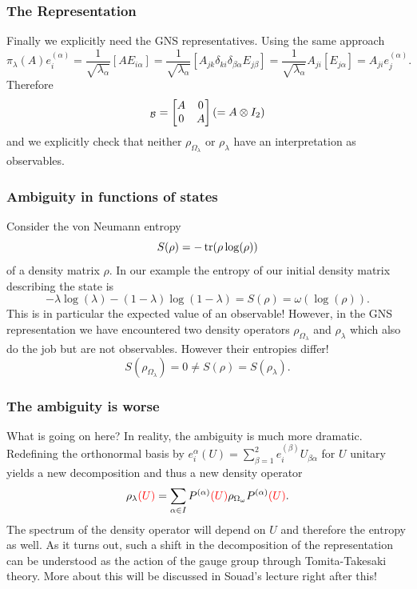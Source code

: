\documentclass{beamer}
\begin{document}
\begin{frame}
	\frametitle{The Representation}
	Finally we explicitly need the GNS representatives. Using the same approach
	\begin{equation*}
		\pi_\lambda(A)e_i^{(\alpha)}=\frac{1}{\sqrt{\lambda_\alpha}}[AE_{i\alpha}]=\frac{1}{\sqrt{\lambda_\alpha}}[A_{jk}\delta_{ki}\delta_{\beta\alpha}E_{j\beta}]=\frac{1}{\sqrt{\lambda_\alpha}}A_{ji}[E_{j\alpha}]=A_{ji}e_j^{(\alpha)}.
	\end{equation*}
	Therefore
	\begin{equation}
		[\pi_\lambda(A)]_\mathcal{B}=\mqty[A & 0\\0 &  A](=A\otimes I_2)
	\end{equation}
	and we explicitly check that neither $\rho_{\Omega_\lambda}$ or $\rho_\lambda$ have an interpretation as observables.
\end{frame}

\begin{frame}
	\frametitle{Ambiguity in functions of states}
	Consider the von Neumann entropy 
	\begin{equation}
		S(\rho)=-\tr(\rho\log(\rho))
	\end{equation}
	 of a density matrix $\rho$. In our example the entropy of our initial density matrix describing the state is 
	 \begin{equation}
	 	-\lambda\log(\lambda)-(1-\lambda)\log(1-\lambda)=S(\rho)=\omega(\log(\rho)).
	 \end{equation} 
	 This is in particular the expected value of an observable! However, in the GNS representation we have encountered two density operators $\rho_{\Omega_\lambda}$ and $\rho_\lambda$ which also do the job but are not observables. However their entropies differ!
	 \begin{equation}
	 	S(\rho_{\Omega_\lambda})=0\neq S(\rho)=S(\rho_\lambda).
	 \end{equation}
\end{frame}

\begin{frame}
	\frametitle{The ambiguity is worse}	
	What is going on here? In reality, the ambiguity is much more dramatic. Redefining the orthonormal basis by $e_i^{\alpha}(U)=\sum_{\beta=1}^2e_i^{(\beta)}U_{\beta\alpha}$ for $U$ unitary yields a new decomposition and thus a new density operator
	\begin{align}
	\begin{split}
		\rho_\lambda\textcolor{red}{(U)}=\sum_{\alpha\in I}P^{(\alpha)}\textcolor{red}{(U)}\rho_{\Omega_\omega}P^{(\alpha)}\textcolor{red}{(U)}.
	\end{split}
	\end{align}	 
	The spectrum of the density operator will depend on $U$ and therefore the entropy as well. As it turns out, such a shift in the decomposition of the representation can be understood as the action of the gauge group through Tomita-Takesaki theory.
	More about this will be discussed in Souad's lecture right after this!
\end{frame}
\end{document}
